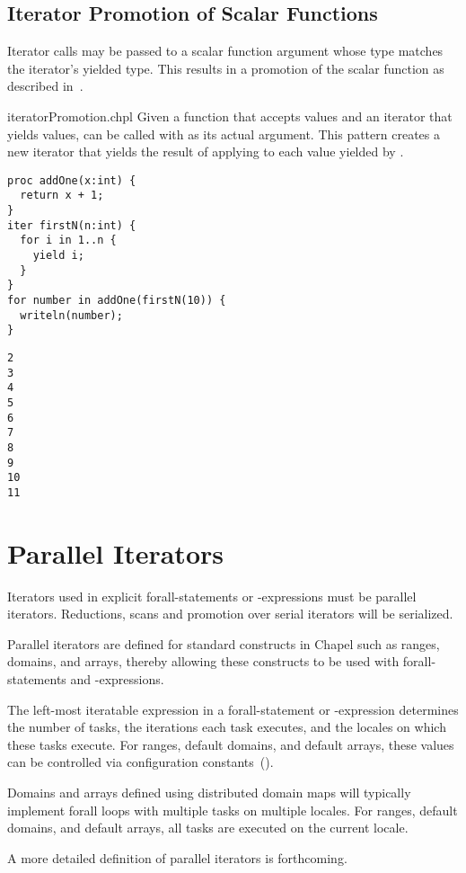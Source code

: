 \subsection{Iterator Promotion of Scalar Functions}
\label{Iterator_Promotion_of_Scalar_Functions}

Iterator calls may be passed to a scalar function argument whose type
matches the iterator's yielded type.  This results in a promotion of the
scalar function as described in~.

\begin{chapelexample}{iteratorPromotion.chpl}
Given a function  that accepts  values
and an iterator  that yields  values,
 can be called with  as its actual argument.
This pattern creates a new iterator that yields the result of applying
 to each value yielded by .

\begin{chapel}
\begin{verbatim}
proc addOne(x:int) {
  return x + 1;
}
iter firstN(n:int) {
  for i in 1..n {
    yield i;
  }
}
for number in addOne(firstN(10)) {
  writeln(number);
}
\end{verbatim}
\end{chapel}
\begin{chapeloutput}
\begin{verbatim}
2
3
4
5
6
7
8
9
10
11
\end{verbatim}
\end{chapeloutput}

\end{chapelexample}

\section{Parallel Iterators}
\label{Parallel_Iterators}

Iterators used in explicit forall-statements or -expressions must be
parallel iterators.  Reductions, scans and promotion over serial
iterators will be serialized.

Parallel iterators are defined for standard constructs in Chapel such
as ranges, domains, and arrays, thereby allowing these constructs to
be used with forall-statements and -expressions.

The left-most iteratable expression in a forall-statement or
-expression determines the number of tasks, the iterations each task
executes, and the locales on which these tasks execute.  For ranges,
default domains, and default arrays, these values can be controlled
via configuration constants~().

Domains and arrays defined using distributed domain maps will
typically implement forall loops with multiple tasks on multiple
locales.  For ranges, default domains, and default arrays, all tasks
are executed on the current locale.

A more detailed definition of parallel iterators is forthcoming.
